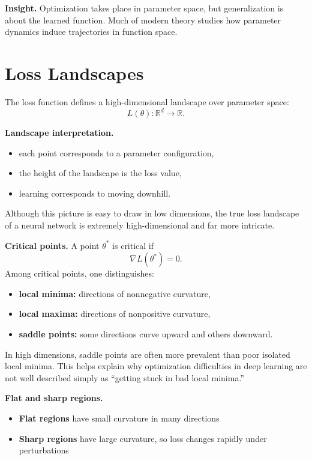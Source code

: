 \medskip

\noindent
\textbf{Insight.}
Optimization takes place in parameter space, but generalization is about the learned function. Much of modern theory studies how parameter dynamics induce trajectories in function space.

\section{Loss Landscapes}

The loss function defines a high-dimensional landscape over parameter space:
\[
L(\theta): \mathbb{R}^d \to \mathbb{R}.
\]

\medskip

\noindent
\textbf{Landscape interpretation.}
\begin{itemize}
    \item each point corresponds to a parameter configuration,
    \item the height of the landscape is the loss value,
    \item learning corresponds to moving downhill.
\end{itemize}

\medskip

\noindent
Although this picture is easy to draw in low dimensions, the true loss landscape of a neural network is extremely high-dimensional and far more intricate.

\medskip

\noindent
\textbf{Critical points.}
A point \(\theta^\ast\) is critical if
\[
\nabla L(\theta^\ast)=0.
\]
Among critical points, one distinguishes:
\begin{itemize}
    \item \textbf{local minima:} directions of nonnegative curvature,
    \item \textbf{local maxima:} directions of nonpositive curvature,
    \item \textbf{saddle points:} some directions curve upward and others downward.
\end{itemize}

\medskip

\noindent
In high dimensions, saddle points are often more prevalent than poor isolated local minima. This helps explain why optimization difficulties in deep learning are not well described simply as ``getting stuck in bad local minima.''

\medskip

\noindent
\textbf{Flat and sharp regions.}
\begin{itemize}
    \item \textbf{Flat regions} have small curvature in many directions
    \item \textbf{Sharp regions} have large curvature, so loss changes rapidly under perturbations
\end{itemize}

